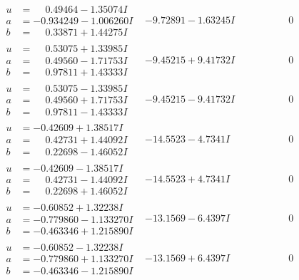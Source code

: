 \documentclass[1p]{elsarticle_modified}
\theoremstyle{definition}
\begin{document}
$$\begin{array}{c|c|c}
\begin{aligned}
u &= \phantom{-}0.49464 - 1.35074 I \\
a &= -0.934249 - 1.006260 I \\
b &= \phantom{-}0.33871 + 1.44275 I\end{aligned}
 & -9.72891 - 1.63245 I & \phantom{-0.000000 } 0 \\ \hline\begin{aligned}
u &= \phantom{-}0.53075 + 1.33985 I \\
a &= \phantom{-}0.49560 - 1.71753 I \\
b &= \phantom{-}0.97811 + 1.43333 I\end{aligned}
 & -9.45215 + 9.41732 I & \phantom{-0.000000 } 0 \\ \hline\begin{aligned}
u &= \phantom{-}0.53075 - 1.33985 I \\
a &= \phantom{-}0.49560 + 1.71753 I \\
b &= \phantom{-}0.97811 - 1.43333 I\end{aligned}
 & -9.45215 - 9.41732 I & \phantom{-0.000000 } 0 \\ \hline\begin{aligned}
u &= -0.42609 + 1.38517 I \\
a &= \phantom{-}0.42731 + 1.44092 I \\
b &= \phantom{-}0.22698 - 1.46052 I\end{aligned}
 & -14.5523 - 4.7341 I & \phantom{-0.000000 } 0 \\ \hline\begin{aligned}
u &= -0.42609 - 1.38517 I \\
a &= \phantom{-}0.42731 - 1.44092 I \\
b &= \phantom{-}0.22698 + 1.46052 I\end{aligned}
 & -14.5523 + 4.7341 I & \phantom{-0.000000 } 0 \\ \hline\begin{aligned}
u &= -0.60852 + 1.32238 I \\
a &= -0.779860 - 1.133270 I \\
b &= -0.463346 + 1.215890 I\end{aligned}
 & -13.1569 - 6.4397 I & \phantom{-0.000000 } 0 \\ \hline\begin{aligned}
u &= -0.60852 - 1.32238 I \\
a &= -0.779860 + 1.133270 I \\
b &= -0.463346 - 1.215890 I\end{aligned}
 & -13.1569 + 6.4397 I & \phantom{-0.000000 } 0 \\ \hline\begin{aligned}

\end{aligned}
\end{array}$$
\end{document}
